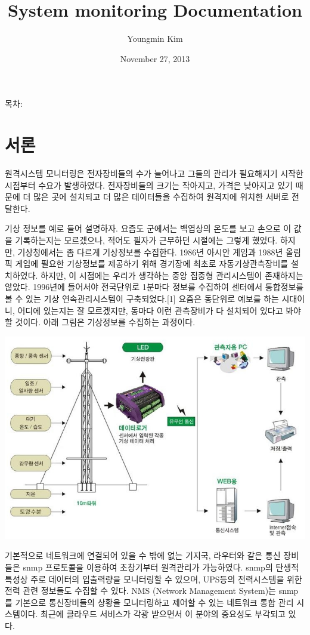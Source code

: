 \documentclass[letterpaper,10pt,english]{sphinxmanual}
\title{System monitoring Documentation}
\date{November 27, 2013}
\author{Youngmin Kim}
\begin{document}
\maketitle
\tableofcontents
{}\label{index::doc}


목차:


\chapter{서론}
\label{intro:id1}\label{intro::doc}\label{intro:ubuntu}
원격시스템 모니터링은 전자장비들의 수가 늘어나고 그들의 관리가 필요해지기 시작한 시점부터 수요가 발생하였다. 전자장비들의 크기는 작아지고, 가격은 낮아지고 있기 때문에 더 많은 곳에 설치되고 더 많은 데이터들을 수집하여 원격지에 위치한 서버로 전달한다.

기상 정보를 예로 들어 설명하자. 요즘도 군에서는 백엽상의 온도를 보고 손으로 이 값을 기록하는지는 모르겠으나, 적어도 필자가 근무하던 시절에는 그렇게 했었다. 하지만,  기상청에서는 좀 다르게 기상정보를 수집한다. 1986년 아시안 게임과 1988년 올림픽 게임에 필요한 기상정보를 제공하기 위해 경기장에 최초로 자동기상관측장비를 설치하였다. 하지만, 이 시점에는 우리가 생각하는 중앙 집중형 관리시스템이 존재하지는 않았다. 1996년에 들어서야 전국단위로 1분마다 정보를 수집하여 센터에서 통합정보를 볼 수 있는 기상 연속관리시스템이 구축되었다.{[}1{]} 요즘은 동단위로 예보를 하는 시대이니, 어디에 있는지는 잘 모르겠지만, 동마다 이런 관측장비가 다 설치되어 있다고 봐야 할 것이다.
아래 그림은 기상정보를 수집하는 과정이다.

\includegraphics{aws.png}

기본적으로 네트워크에 연결되어 있을 수 밖에 없는 기지국, 라우터와 같은 통신 장비들은 snmp 프로토콜을 이용하여 초창기부터 원격관리가 가능하였다. snmp의 탄생적 특성상 주로 데이터의 입출력량을 모니터링할 수 있으며, UPS등의 전력시스템을 위한 전력 관련 정보들도 수집할 수 있다. NMS (Network Management System)는 snmp를 기본으로 통신장비들의 상황을 모니터링하고 제어할 수 있는 네트워크 통합 관리 시스템이다. 최근에 클라우드 서비스가 각광 받으면서 이 분야의 중요성도 부각되고 있다.
\end{document}
